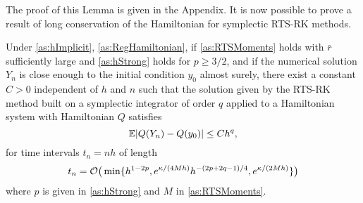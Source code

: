 \documentclass[10pt]{article}
\begin{document}
	The proof of this Lemma is given in the Appendix. It is now possible to prove a result of long conservation of the Hamiltonian for symplectic RTS-RK methods.
\begin{theorem}\label{thm:RTSHamiltonian} Under \cref{as:hImplicit}, \cref{as:RegHamiltonian}, if \cref{as:RTSMoments} holds with $\bar r$ sufficiently large and \cref{as:hStrong} holds for $p \geq 3/2$, and if the numerical solution $Y_n$ is close enough to the initial condition $y_0$ almost surely, there exist a constant $C > 0$ independent of $h$ and $n$ such that the solution given by the RTS-RK method built on a symplectic integrator of order $q$ applied to a Hamiltonian system with Hamiltonian $Q$ satisfies
		\begin{equation}
		\operatorname{\mathbb{E}} \lvert Q(Y_n) - Q(y_0)\rvert \leq C h^q,
		\end{equation}
		for time intervals $t_n = nh$ of length 
		\begin{equation}
		t_n = \mathcal{O}\big(\min\{h^{1-2p}, e^{\kappa/(4Mh)} h^{-(2p+2q-1)/4}, e^{\kappa/(2Mh)}\}\big)
		\end{equation}
		where $p$ is given in \cref{as:hStrong} and $M$ in \cref{as:RTSMoments}.
\end{theorem}
\end{document}

